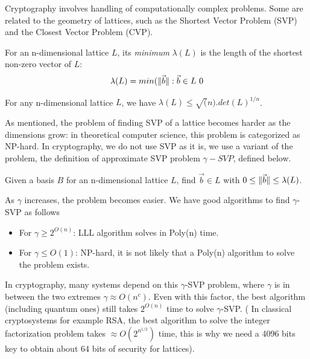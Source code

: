Cryptography involves handling of computationally complex problems. Some are related to the geometry of lattices, such as the Shortest
Vector Problem (SVP) and the Closest Vector Problem (CVP).
\begin{definition}
  For an n-dimensional lattice $L$, its \emph{minimum} $\lambda(L)$ is the
  length of the shortest non-zero vector of $L$:
  \[
    \lambda(L) = min(\Vert \vec{b} \Vert: \vec{b} \in L \ 0
  \]
  \label{def:minLattice}
\end{definition}
\begin{theorem}
   For any n-dimensional lattice $L$, we have
  $\lambda(L) \leq \sqrt(n).det(L)^{1/n}$.
  \label{the:minkowski1}
\end{theorem}
As mentioned, the problem of finding SVP of a lattice becomes harder as the dimensions
grow: in theoretical computer science, this problem is categorized as
NP-hard. In cryptography, we do not use SVP as it is, we use a variant of the
problem, the definition of approximate SVP problem $\gamma-SVP$, defined below.
\begin{definition}
   Given a basis $B$ for an n-dimensional lattice $L$,
  find $\vec{b} \in L$ with $0 \leq \Vert \vec{b} \Vert \leq \lambda(L)$.
  \label{def:gammaSVP}
\end{definition}
As $\gamma$ increases, the problem becomes easier. We have good algorithms to
find $\gamma$-SVP as follows
\begin{itemize}
\item For $\gamma \geq 2^{O(n)}$: LLL algorithm solves in Poly(n) time.
\item For $\gamma \leq O(1)$: NP-hard, it is not likely that a Poly(n) algorithm to solve the problem exists.
\end{itemize}
In cryptography, many systems depend on this $\gamma$-SVP problem, where
$\gamma$ is in between the two extremes $\gamma \approx O(n^c)$. Even with this
factor, the best algorithm (including quantum ones) still takes $2^{O(n)}$ time
to solve $\gamma$-SVP. ( In classical cryptosystems for example RSA, the best
algorithm to solve the integer factorization problem takes
$\approx O(2^{n^{1/2}})$ time, this is why we need a 4096 bits key to obtain
about 64 bits of security for lattices).

